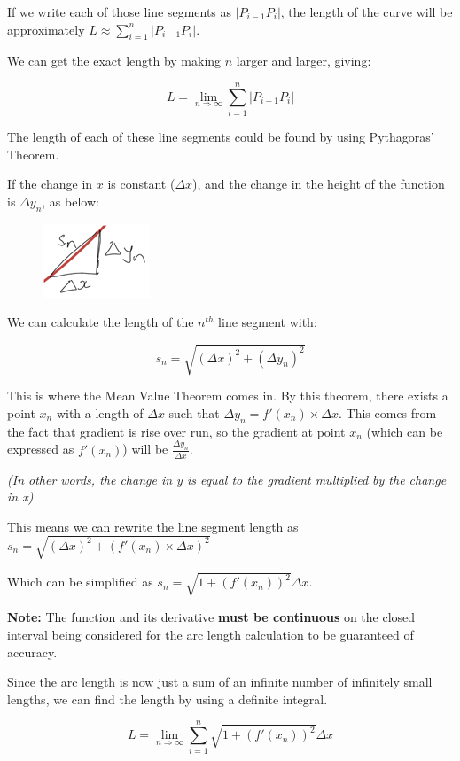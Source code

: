 \documentclass[../main.tex]{subfiles}
\begin{document}
If we write each of those line segments as $|P_{i-1} P_{i}|$, the length of the curve will be approximately $L\approx \sum\limits_{i=1}^n |P_{i-1} P_i|$.

We can get the exact length by making $n$ larger and larger, giving:

\[L=\lim\limits_{n \Rightarrow \infty} \sum\limits_{i=1}^n |P_{i-1} P_i|\]


The length of each of these line segments could be found by using Pythagoras' Theorem. 

If the change in $x$ is constant ($\Delta x$), and the change in the height of the function is $\Delta y_n$, as below:

\begin{figure}[h]
    \centering
    \includegraphics[width=0.2\linewidth]{images/arclength3.png}
\end{figure}

We can calculate the length of the $n^{th}$ line segment with:

\[s_n=\sqrt{(\Delta x)^2+(\Delta y_n)^2}\]


This is where the Mean Value Theorem comes in. By this theorem, there exists a point $x_n$ with a length of $\Delta x$ such that $\Delta y_n=f'(x_n)\times \Delta x$. This comes from the fact that gradient is rise over run, so the gradient at point $x_n$ (which can be expressed as $f'(x_n)$) will be $\frac{\Delta y_n}{\Delta x}$.

\textit{(In other words, the change in y is equal to the gradient multiplied by the change in x)}

This means we can rewrite the line segment length as $s_n=\sqrt{(\Delta x)^2+(f'(x_n)\times \Delta x)^2}$

Which can be simplified as $s_n=\sqrt{1+(f'(x_n))^2}\Delta x$.

\textbf{Note:} The function and its derivative \textbf{must be continuous} on the closed interval being considered for the arc length calculation to be guaranteed of accuracy.

Since the arc length is now just a sum of an infinite number of infinitely small lengths, we can find the length by using a definite integral.

\[L=\lim\limits_{n \Rightarrow \infty} \sum\limits_{i=1}^n \sqrt{1+(f'(x_n))^2} \Delta x\]
\end{document}
